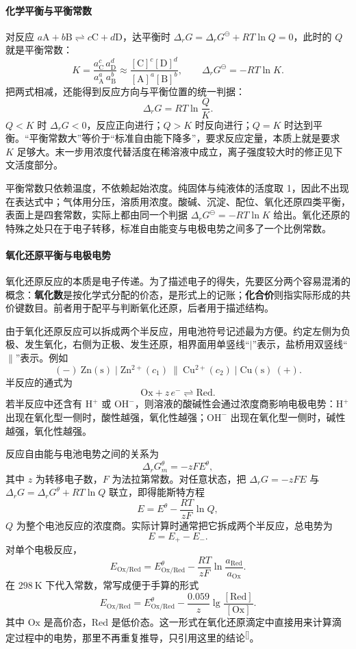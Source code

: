 \documentclass[UTF8]{ctexbook}
\begin{document}
\paragraph{化学平衡与平衡常数}

对反应 \(a\mathrm{A}+b\mathrm{B}\rightleftharpoons c\mathrm{C}+d\mathrm{D}\)，达平衡时 \(\Delta_rG=\Delta_rG^{\ominus}+RT\ln Q=0\)，此时的 \(Q\) 就是平衡常数：
\[
K=\frac{a_{\mathrm{C}}^c\,a_{\mathrm{D}}^d}{a_{\mathrm{A}}^a\,a_{\mathrm{B}}^b}
\approx\frac{[\mathrm{C}]^c[\mathrm{D}]^d}{[\mathrm{A}]^a[\mathrm{B}]^b},
\qquad
\Delta_rG^{\ominus}=-RT\ln K .
\]
把两式相减，还能得到反应方向与平衡位置的统一判据：
\[
\Delta_rG=RT\ln\frac{Q}{K}.
\]
\(Q<K\) 时 \(\Delta_rG<0\)，反应正向进行；\(Q>K\) 时反向进行；\(Q=K\) 时达到平衡。“平衡常数大”等价于“标准自由能下降多”，要求反应定量，本质上就是要求 \(K\) 足够大。末一步用浓度代替活度在稀溶液中成立，离子强度较大时的修正见下文活度部分。

平衡常数只依赖温度，不依赖起始浓度。纯固体与纯液体的活度取 1，因此不出现在表达式中；气体用分压，溶质用浓度。酸碱、沉淀、配位、氧化还原四类平衡，表面上是四套常数，实际上都由同一个判据 \(\Delta_rG^{\ominus}=-RT\ln K\) 给出。氧化还原的特殊之处只在于电子转移，标准自由能变与电极电势之间多了一个比例常数。

\label{sec:nernst}
\paragraph{氧化还原平衡与电极电势}

氧化还原反应的本质是电子传递。为了描述电子的得失，先要区分两个容易混淆的概念：\textbf{氧化数}是按化学式分配的价态，是形式上的记账；\textbf{化合价}则指实际形成的共价键数目。前者用于配平与判断氧化还原，后者用于描述结构。

由于氧化还原反应可以拆成两个半反应，用电池符号记述最为方便。约定左侧为负极、发生氧化，右侧为正极、发生还原，相界面用单竖线“\(|\)”表示，盐桥用双竖线“\(\|\)”表示。例如
\[
(-)\ \mathrm{Zn(s)}\mid\mathrm{Zn^{2+}}(c_1)\ \|\ \mathrm{Cu^{2+}}(c_2)\mid\mathrm{Cu(s)}\ (+).
\]
半反应的通式为
\[
\mathrm{Ox}+z\,e^-\rightleftharpoons\mathrm{Red}.
\]
若半反应中还含有 \(\mathrm{H^+}\) 或 \(\mathrm{OH^-}\)，则溶液的酸碱性会通过浓度商影响电极电势：\(\mathrm{H^+}\) 出现在氧化型一侧时，酸性越强，氧化性越强；\(\mathrm{OH^-}\) 出现在氧化型一侧时，碱性越强，氧化性越强。

反应自由能与电池电势之间的关系为
\[
\Delta_rG_m^\theta=-zFE^\theta ,
\]
其中 \(z\) 为转移电子数，\(F\) 为法拉第常数。对任意状态，把 \(\Delta_rG=-zFE\) 与 \(\Delta_rG=\Delta_rG^\theta+RT\ln Q\) 联立，即得能斯特方程
\[
E=E^\theta-\frac{RT}{zF}\ln Q,
\]
\(Q\) 为整个电池反应的浓度商。实际计算时通常把它拆成两个半反应，总电势为
\[
E=E_+-E_- .
\]
对单个电极反应，
\[
E_{\mathrm{Ox/Red}}=E^\theta_{\mathrm{Ox/Red}}
-\frac{RT}{zF}\ln\frac{a_{\mathrm{Red}}}{a_{\mathrm{Ox}}}.
\]
在 \(298~\mathrm{K}\) 下代入常数，常写成便于手算的形式
\[
E_{\mathrm{Ox/Red}}=E^\theta_{\mathrm{Ox/Red}}
-\frac{0.059}{z}\lg\frac{[\mathrm{Red}]}{[\mathrm{Ox}]}.
\]
其中 \(\mathrm{Ox}\) 是高价态，\(\mathrm{Red}\) 是低价态。这一形式在氧化还原滴定中直接用来计算滴定过程中的电势，那里不再重复推导，只引用这里的结论\textsuperscript{[\pageref{sec:redox-titration}]}。
\end{document}
